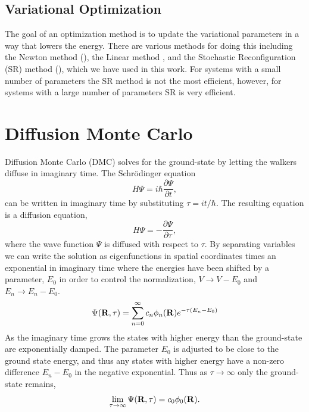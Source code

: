 \subsection{Variational Optimization}
The goal of an optimization method is to update the variational parameters in a way that lowers the energy. There are various methods for doing this including the Newton method (\cite{casalegno2003,umrigar2005}), the Linear method \cite{toulouse2007}, and the Stochastic Reconfiguration (SR) method (\cite{casula2004,sorella2001,sorella2005}), which we have used in this work. For systems with a small number of parameters the SR method is not the most efficient, however, for systems with a large number of parameters SR is very efficient.

\section{Diffusion Monte Carlo}
Diffusion Monte Carlo (DMC) solves for the ground-state by letting the walkers diffuse in imaginary time. The Schr\"odinger equation
\begin{equation}
   H\Psi = i\hbar\frac{\partial\Psi}{\partial t},
\end{equation}
can be written in imaginary time by substituting $\tau=it/\hbar$. The resulting equation is a diffusion equation,
\begin{equation}
   H\Psi = -\frac{\partial\Psi}{\partial\tau},
   \label{equ:diffusion}
\end{equation}
where the wave function $\Psi$ is diffused with respect to $\tau$. By separating variables we can write the solution as eigenfunctions in spatial coordinates times an exponential in imaginary time where the energies have been shifted by a parameter, $E_0$ in order to control the normalization, $V\rightarrow V - E_0$ and $E_n \rightarrow E_n-E_0$.
\begin{equation}
   \Psi(\mathbf{R},\tau) = \sum\limits_{n=0}^\infty c_n\phi_n(\mathbf{R})e^{-\tau(E_n-E_0)}
\end{equation}
As the imaginary time grows the states with higher energy than the ground-state are exponentially damped. The parameter $E_0$ is adjusted to be close to the ground state energy, and thus any states with higher energy have a non-zero difference $E_n-E_0$ in the negative exponential. Thus as $\tau\rightarrow\infty$ only the ground-state remains,
\begin{equation}
   \lim\limits_{\tau\rightarrow\infty}\Psi(\mathbf{R},\tau) = c_0\phi_0(\mathbf{R}).
\end{equation}

